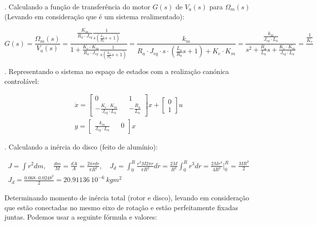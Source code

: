 \documentclass[10pt]{article}
\begin{document}
. Calculando a função de transferência do motor $G(s)$ de $V_a(s)$ para $\Omega_m(s)$
(Levando em consideração que é um sistema realimentado):

\begin{equation}
    G(s) = \frac{\Omega_m(s)}{V_a(s)}
    = \frac{\frac{K_m}{R_a \cdot J_{eq}}\frac{1}{s (\frac{L_a}{R_a}s + 1)}}{1 + \frac{K_e \cdot K_m}{R_a \cdot J_{eq}}\frac{1}{s (\frac{L_a}{R_a}s + 1)}}
    = \frac{k_m}{R_a \cdot J_{eq} \cdot s \cdot (\frac{L_a}{R_a}s + 1) + K_e \cdot K_m}
    = \frac{\frac{k_m}{J_{eq} \cdot L_a}}{s^2 + \frac{R_a}{L_a}s + \frac{K_e \cdot K_m}{J_{eq} \cdot L_a}}
    = \frac{\frac{1}{K_e}}{}
\end{equation}

. Representando o sistema no espaço de estados com a realização canónica controlável:

\begin{equation}
\begin{aligned}
    \dot{x} =
    \begin{bmatrix}
        0 && 1 \\
        -\frac{K_e \cdot K_m}{J_{eq} \cdot L_a} && -\frac{R_a}{L_a}
    \end{bmatrix} x
    +
    \begin{bmatrix}
        0 \\
        1
    \end{bmatrix}
    u \\
    y =
    \begin{bmatrix}
        \frac{k_m}{J_{eq} \cdot L_a} && 0
    \end{bmatrix} x
\end{aligned}
\end{equation}

. Calculando a inércia do disco (feito de alumínio):

\begin{equation}
\begin{aligned}
    J = \int r^2 dm
    ,\quad \frac{dm}{M} = \frac{dA}{A} = \frac{2 \pi r dr}{\pi R^2}
    ,\quad J_d = \int_{0}^{R} \frac{r^2 M 2 \pi r}{\pi R^2} dr
    = \frac{2M}{R^2} \int_{0}^{R} r^3 dr
    = \frac{2Mr^4}{4R^2} \Bigg|_{0}^{R}
    = \frac{MR^2}{2} \\
    J_d = \frac{0.068 \cdot 0.0248^2}{2} = 20.91136 \ 10^{-6} \ kgm^2
\end{aligned}
\end{equation}

\quad Determinando momento de inércia total (rotor e disco),
levando em consideração que estão conectadas no mesmo eixo de rotação e
estão perfeitamente fixadas juntas. Podemos usar a seguinte fórmula e valores:
\end{document}
